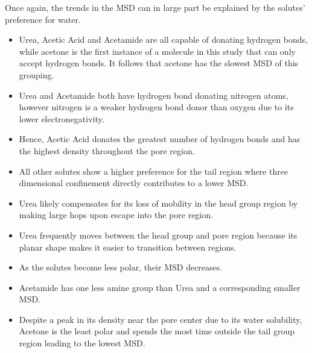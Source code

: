 \documentclass{article}
\begin{document}
  Once again, the trends in the MSD can in large part be explained by the solutes'
  preference for water.
  \begin{itemize}
  	\item Urea, Acetic Acid and Acetamide are all capable of donating hydrogen bonds,
  	while acetone is the first instance of a molecule in this study that can only
  	accept hydrogen bonds. It follows that acetone has the slowest MSD of this grouping.
  	\item Urea and Acetamide both have hydrogen bond donating nitrogen atoms, however
  	nitrogen is a weaker hydrogen bond donor than oxygen due to its lower electronegativity.
  	\item Hence, Acetic Acid donates the greatest number of hydrogen bonds and has
  	the highest density throughout the pore region.
  	\item All other solutes show a higher preference for the tail region where three 
  	dimensional confinement directly contributes to a lower MSD.
  	\item Urea likely compensates for its loss of mobility in the head group region by
  	making large hops upon escape into the pore region.
  	\item Urea frequently moves between the head group and pore region because its planar
  	shape makes it easier to transition between regions.%
  	\item As the solutes become less polar, their MSD decreases. 
  	\item Acetamide has one less amine group than Urea and a corresponding smaller MSD.
  	\item Despite a peak in its density near the pore center due to its water solubility,
  	Acetone is the least polar and spends the most time outside the tail group region 
  	leading to the lowest MSD.

\end{itemize}
\end{document}
